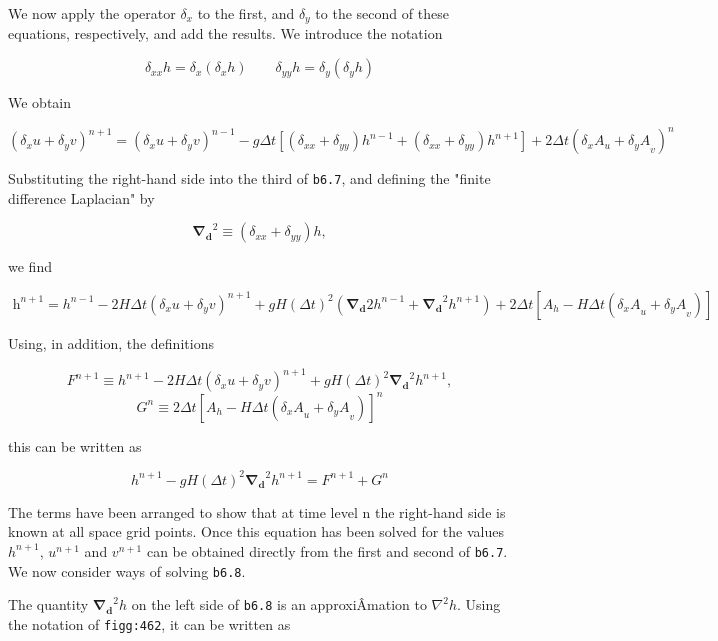 We now apply the operator \(\delta_{x}\) to the first, and
\(\delta_{y}\) to the second of these equations, respectively, and add
the results. We introduce the notation

\[\delta_{xx}h = \delta_x(\delta_x h ) \qquad  \delta_{yy}h = \delta_y(\delta_y h )\]

We obtain

\[\left( \delta_{x}u + \delta_{y}v \right)^{n + 1} =
\left( \delta_{x}u + \delta_{y}v \right)^{n - 1} 
- g\Delta t \left[ ( \delta_{xx} + \delta_{yy} )h^{n - 1} 
+ ( \delta_{xx} + \delta_{yy} )h^{n + 1}\right] +
2\Delta t( \delta_{x}A_{u} + {\delta_{y}A}_{v})^{n}\]

Substituting the right-hand side into the third of \texttt{b6.7}, and
defining the "finite difference Laplacian" by

\[\mathbf{\nabla_d}^2 \equiv ( \delta_{xx} + \delta_{yy} )h,\]

we find

\[\text{  h}^{n + 1} = h^{n - 1} - 2H\Delta t\left( \delta_{x}u + \delta_{y}v \right)^{n + 1}
 + gH\left( \Delta t \right)^{2}\left( \mathbf{\nabla_d}{2}h^{n - 1} + \mathbf{\nabla_d}^{2}h^{n + 1} \right) 
 + 2\Delta t\left\lbrack A_{h} - H\Delta t\left( {\delta_{x}A}_{u} + {\delta_{y}A}_{v} \right) \right\rbrack\]

Using, in addition, the definitions

\[F^{n + 1} \equiv h^{n + 1} - 2H\Delta t \left( \delta_{x}u + \delta_{y}v \right)^{n + 1} + gH(\Delta t)^{2}\mathbf{\nabla_d}^2 h^{n + 1},\]\[G^{n} \equiv 2\Delta t \left\lbrack A_{h} - H\Delta t\left( {\delta_{x}A}_{u} + {\delta_{y}A}_{v} \right) \right\rbrack^{n}\]

this can be written as

{\[h^{n + 1} - gH(\Delta t )^{2}\mathbf{\nabla_d}^{2}h^{n + 1} = F^{n + 1} + G^{n}\]}

The terms have been arranged to show that at time level n the right-hand
side is known at all space grid points. Once this equation has been
solved for the values \(h^{n + 1}\), \(u^{n + 1}\) and \(v^{n + 1}\) can
be obtained directly from the first and second of \texttt{b6.7}. We now
consider ways of solving \texttt{b6.8}.

The quantity \(\mathbf{\nabla_d}^{2}h\) on the left side of
\texttt{b6.8} is an approxiÂ­mation to \(\nabla^{2}h\). Using the
notation of \texttt{figg:462}, it can be written as

\begin{figure}
\centering
{}
\caption{}
\end{figure}

